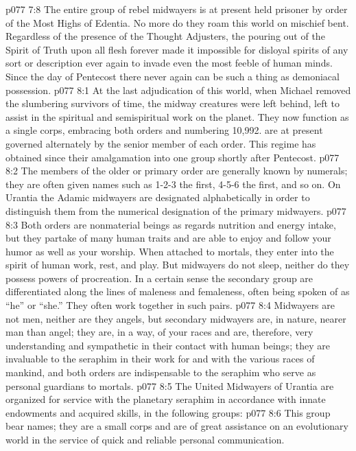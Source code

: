 \vs p077 7:8 The entire group of rebel midwayers is at present held prisoner by order of the Most Highs of Edentia. No more do they roam this world on mischief bent. Regardless of the presence of the Thought Adjusters, the pouring out of the Spirit of Truth upon all flesh forever made it impossible for disloyal spirits of any sort or description ever again to invade even the most feeble of human minds. Since the day of Pentecost there never again can be such a thing as demoniacal possession.
\vs p077 8:1 At the last adjudication of this world, when Michael removed the slumbering survivors of time, the midway creatures were left behind, left to assist in the spiritual and semispiritual work on the planet. They now function as a single corps, embracing both orders and numbering 10,992.  are at present governed alternately by the senior member of each order. This regime has obtained since their amalgamation into one group shortly after Pentecost.
\vs p077 8:2 The members of the older or primary order are generally known by numerals; they are often given names such as 1\hyp{}2\hyp{}3 the first, 4\hyp{}5\hyp{}6 the first, and so on. On Urantia the Adamic midwayers are designated alphabetically in order to distinguish them from the numerical designation of the primary midwayers.
\vs p077 8:3 Both orders are nonmaterial beings as regards nutrition and energy intake, but they partake of many human traits and are able to enjoy and follow your humor as well as your worship. When attached to mortals, they enter into the spirit of human work, rest, and play. But midwayers do not sleep, neither do they possess powers of procreation. In a certain sense the secondary group are differentiated along the lines of maleness and femaleness, often being spoken of as “he” or “she.” They often work together in such pairs.
\vs p077 8:4 Midwayers are not men, neither are they angels, but secondary midwayers are, in nature, nearer man than angel; they are, in a way, of your races and are, therefore, very understanding and sympathetic in their contact with human beings; they are invaluable to the seraphim in their work for and with the various races of mankind, and both orders are indispensable to the seraphim who serve as personal guardians to mortals.
\pc \vs p077 8:5 The United Midwayers of Urantia are organized for service with the planetary seraphim in accordance with innate endowments and acquired skills, in the following groups:
\pc \vs p077 8:6 \bibnobreakspace {} This group bear names; they are a small corps and are of great assistance on an evolutionary world in the service of quick and reliable personal communication.
